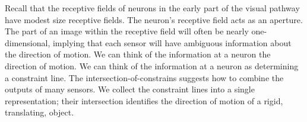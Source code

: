 Recall that the receptive fields of neurons in the early part of the visual
pathway have modest size receptive fields.
The neuron's receptive field acts as an aperture.
The part of an image within the receptive field
will often be nearly one-dimensional, implying
that each sensor will have ambiguous information about
the direction of motion.
We can think of the information at a neuron
the direction of motion.
We can think of the information at a neuron
as determining a constraint line.
The intersection-of-constrains suggests how
to combine the outputs of many sensors.
We collect the constraint lines into a single representation;
their intersection identifies the
direction of motion of a rigid, translating, object.
